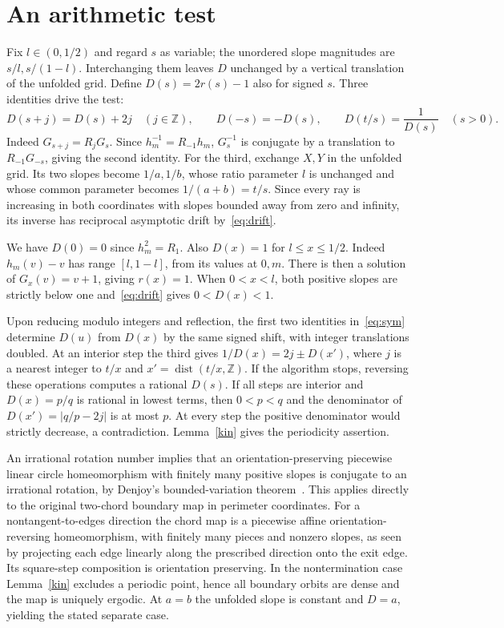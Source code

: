 \documentclass[11pt]{article}
\newcommand{\dist}{\operatorname{dist}}
\newcommand{\Z}{\mathbb Z}
\begin{document}
\section{An arithmetic test}
Fix $l\in(0,1/2)$ and regard $s$ as variable; the unordered slope magnitudes are $s/l,s/(1-l)$. Interchanging them leaves $D$ unchanged by a vertical translation of the unfolded grid. Define $D(s)=2r(s)-1$ also for signed $s$. Three identities drive the test:
\begin{equation}\label{eq:sym}
 D(s+j)=D(s)+2j\quad(j\in\Z),\qquad D(-s)=-D(s),\qquad
 D(t/s)=\frac1{D(s)}\quad(s>0).
\end{equation}
Indeed $G_{s+j}=R_jG_s$. Since $h_m^{-1}=R_{-1}h_m$, $G_s^{-1}$ is conjugate by a translation to $R_{-1}G_{-s}$, giving the second identity. For the third, exchange $X,Y$ in the unfolded grid. Its two slopes become $1/a,1/b$, whose ratio parameter $l$ is unchanged and whose common parameter becomes $1/(a+b)=t/s$. Since every ray is increasing in both coordinates with slopes bounded away from zero and infinity, its inverse has reciprocal asymptotic drift by~\eqref{eq:drift}.

We have $D(0)=0$ since $h_m^2=R_1$. Also $D(x)=1$ for $l\le x\le1/2$. Indeed $h_m(v)-v$ has range $[l,1-l]$, from its values at $0,m$. There is then a solution of $G_x(v)=v+1$, giving $r(x)=1$. When $0<x<l$, both positive slopes are strictly below one and~\eqref{eq:drift} gives $0<D(x)<1$.

Upon reducing modulo integers and reflection, the first two identities in~\eqref{eq:sym} determine $D(u)$ from $D(x)$ by the same signed shift, with integer translations doubled. At an interior step the third gives $1/D(x)=2j\mathbin{\pm}D(x')$, where $j$ is a nearest integer to $t/x$ and $x'=\dist(t/x,\Z)$. If the algorithm stops, reversing these operations computes a rational $D(s)$. If all steps are interior and $D(x)=p/q$ is rational in lowest terms, then $0<p<q$ and the denominator of $D(x')=|q/p-2j|$ is at most $p$. At every step the positive denominator would strictly decrease, a contradiction. Lemma~\ref{kin} gives the periodicity assertion.

An irrational rotation number implies that an orientation-preserving piecewise linear circle homeomorphism with finitely many positive slopes is conjugate to an irrational rotation, by Denjoy's bounded-variation theorem~\cite{denjoy}. This applies directly to the original two-chord boundary map in perimeter coordinates. For a nontangent-to-edges direction the chord map is a piecewise affine orientation-reversing homeomorphism, with finitely many pieces and nonzero slopes, as seen by projecting each edge linearly along the prescribed direction onto the exit edge. Its square-step composition is orientation preserving. In the nontermination case Lemma~\ref{kin} excludes a periodic point, hence all boundary orbits are dense and the map is uniquely ergodic. At $a=b$ the unfolded slope is constant and $D=a$, yielding the stated separate case.
\end{document}
